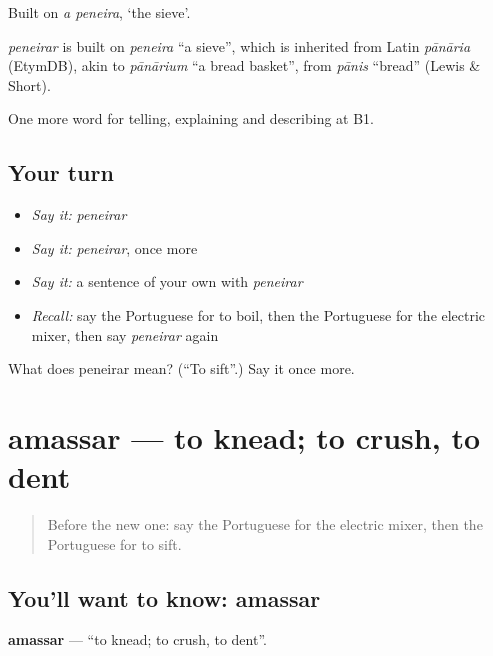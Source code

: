 Built on \emph{a peneira}, ‘the sieve’.

\begin{cousinweb}
\emph{peneirar} is built on \emph{peneira} \textquotedblleft{}a sieve\textquotedblright{}, which is inherited from Latin \emph{pānāria} (EtymDB), akin to \emph{pānārium} \textquotedblleft{}a bread basket\textquotedblright{}, from \emph{pānis} \textquotedblleft{}bread\textquotedblright{} (Lewis \& Short).
\end{cousinweb}

\begin{grammarlens}[title={What you've built}]
One more word for telling, explaining and describing at B1.
\end{grammarlens}

\subsection*{Your turn}
\begin{itemize}
\raggedright
  \item \emph{Say it:} \emph{peneirar}
  \item \emph{Say it:} \emph{peneirar}, once more
  \item \emph{Say it:} a sentence of your own with \emph{peneirar}
  \item \emph{Recall:} say the Portuguese for to boil, then the Portuguese for the electric mixer, then say \emph{peneirar} again
\end{itemize}

\begin{tcolorbox}[breakable,colback=teal!4,colframe=teal!35!black,title={Before you move on}]
What does peneirar mean? (\textquotedblleft{}To sift\textquotedblright{}.) Say it once more.
\end{tcolorbox}
\section[amassar]{amassar — to knead; to crush, to dent}

\label{lesson:PT-C333-amassar}



\begin{quote}
Before the new one: say the Portuguese for the electric mixer, then the Portuguese for to sift.
\end{quote}

\subsection*{You'll want to know: amassar}
\textbf{amassar} — \textquotedblleft{}to knead; to crush, to dent\textquotedblright{}.

